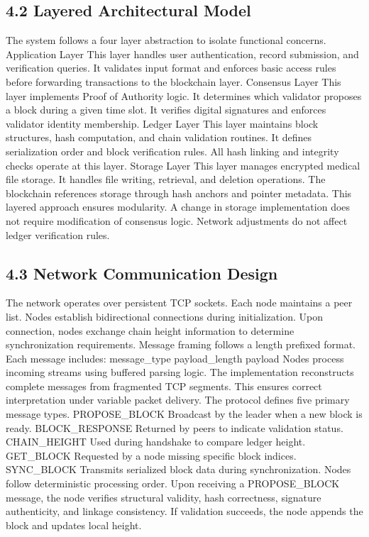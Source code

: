 \subsection*{4.2 Layered Architectural Model}
The system follows a four layer abstraction to isolate functional concerns.
Application Layer
This layer handles user authentication, record submission, and verification queries. It validates input format and enforces basic access rules before forwarding transactions to the blockchain layer.
Consensus Layer
This layer implements Proof of Authority logic. It determines which validator proposes a block during a given time slot. It verifies digital signatures and enforces validator identity membership.
Ledger Layer
This layer maintains block structures, hash computation, and chain validation routines. It defines serialization order and block verification rules. All hash linking and integrity checks operate at this layer.
Storage Layer
This layer manages encrypted medical file storage. It handles file writing, retrieval, and deletion operations. The blockchain references storage through hash anchors and pointer metadata.
This layered approach ensures modularity. A change in storage implementation does not require modification of consensus logic. Network adjustments do not affect ledger verification rules.

\subsection*{4.3 Network Communication Design}
The network operates over persistent TCP sockets. Each node maintains a peer list. Nodes establish bidirectional connections during initialization. Upon connection, nodes exchange chain height information to determine synchronization requirements.
Message framing follows a length prefixed format. Each message includes:
message_type
payload_length
payload
Nodes process incoming streams using buffered parsing logic. The implementation reconstructs complete messages from fragmented TCP segments. This ensures correct interpretation under variable packet delivery.
The protocol defines five primary message types.
PROPOSE_BLOCK
Broadcast by the leader when a new block is ready.
BLOCK_RESPONSE
Returned by peers to indicate validation status.
CHAIN_HEIGHT
Used during handshake to compare ledger height.
GET_BLOCK
Requested by a node missing specific block indices.
SYNC_BLOCK
Transmits serialized block data during synchronization.
Nodes follow deterministic processing order. Upon receiving a PROPOSE\_BLOCK message, the node verifies structural validity, hash correctness, signature authenticity, and linkage consistency. If validation succeeds, the node appends the block and updates local height.

